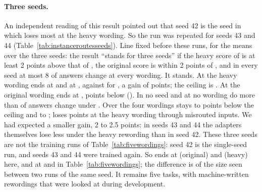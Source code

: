 \paragraph{Three seeds.} An independent reading of this result pointed out that seed 42 is the seed in which \cert{} loses most at the heavy wording. So the run was repeated for seeds 43 and 44 (Table~\ref{tab:instanceroutesseeds}).
Line fixed before these runs, for the means over the three seeds: the result ``stands for three seeds'' if the heavy score of \recog{} is at least 2 points above that of \cert{}, the original score is within 2 points of \cert{}, and in every seed at most 8 of \AudUCompared{} answers change at every wording.
It stands. At the heavy wording \recog{} ends at \AudUThreeHeavyRidgeAP{} and \handicap{} at \AudUThreeHeavyHandicapAP{}, against \AudUThreeHeavyCertAP{} for \cert{}, a gain of \AudUThreeHeavyRidgeAboveCert{} points; the ceiling is \AudUThreeHeavyOwnAP{}.
At the original wording \recog{} ends at \AudUThreeOriginalRidgeAP{}, \AudUThreeOriginalRidgeBelowCert{} points below \cert{} (\AudUThreeOriginalCertAP{}).
In no seed and at no wording do more than \AudUThreeMaxChangedPerSeed{} of \AudUCompared{} answers change under \recog{}.
Over the four wordings \recog{} stays \AudUThreeRidgeBelowOwnLow{} to \AudUThreeRidgeBelowOwnHigh{} points below the ceiling and \handicap{} \AudUThreeHandicapBelowOwnLow{} to \AudUThreeHandicapBelowOwnHigh{}; \cert{} loses \AudUThreeHeavyCertBelowOwn{} points at the heavy wording through misrouted inputs.
We had expected a smaller gain, 2 to 2.5 points: in seeds 43 and 44 the adapters themselves lose less under the heavy rewording than in seed 42.
These three seeds are not the training runs of Table~\ref{tab:fivewordings}: seed 42 is the single-seed run, and seeds 43 and 44 were trained again. So \cert{} ends at \AudUThreeOriginalCertAPOne{} (original) and \AudUThreeHeavyCertAPOne{} (heavy) here, and at \FiveCertAP{} and \FiveCertAPHeavy{} in Table~\ref{tab:fivewordings}; the difference is of the size seen between two runs of the same seed.
It remains five tasks, with machine-written rewordings that were looked at during development.

\begin{table}[t]
  \caption{As Table~\ref{tab:instanceroutes}, means over \AudUThreeSeeds{} seeds (42, 43, 44); changed answers are summed over the seeds. Training runs: seed 42 as in Table~\ref{tab:instanceroutes}, seeds 43 and 44 trained for this table; they are not the runs of Table~\ref{tab:fivewordings}, so the rows of \cert{} differ from it by a few tenths of a point.}
  \label{tab:instanceroutesseeds}
  \centering
  
\end{table}
